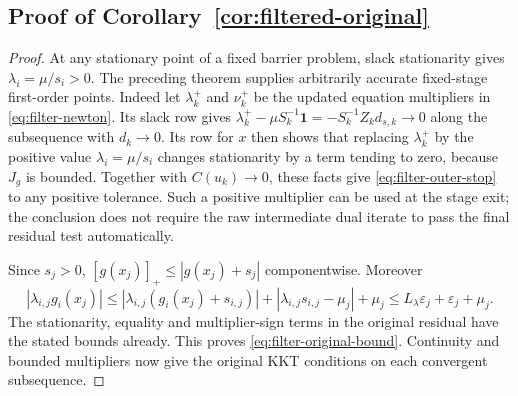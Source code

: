 \documentclass[pdflatex,sn-mathphys-num]{sn-jnl}
\theoremstyle{thmstyleone}
\theoremstyle{thmstylethree}
\begin{document}
\subsection{Proof of Corollary~\ref{cor:filtered-original}}
\begin{proof}
At any stationary point of a fixed barrier problem, slack
stationarity gives $\lambda_i=\mu/s_i>0$.
The preceding theorem supplies arbitrarily accurate fixed-stage
first-order points. Indeed let $\lambda_k^+$ and $\nu_k^+$ be the
updated equation multipliers in \eqref{eq:filter-newton}.
Its slack row gives
$\lambda_k^+-\mu S_k^{-1}\mathbf1
 =-S_k^{-1}Z_kd_{s,k}\to0$
along the subsequence with $d_k\to0$.
Its row for $x$ then shows that replacing $\lambda_k^+$ by the
positive value $\lambda_i=\mu/s_i$ changes stationarity
by a term tending to zero, because $J_g$ is bounded.
Together with $C(u_k)\to0$, these facts give
\eqref{eq:filter-outer-stop} to any positive tolerance.
Such a positive multiplier can be used at the stage exit;
the conclusion does not require the raw intermediate dual iterate
to pass the final residual test automatically.

Since $s_j>0$,
$[g(x_j)]_+\leq|g(x_j)+s_j|$ componentwise.
Moreover
\[
 |\lambda_{i,j}g_i(x_j)|
 \leq|\lambda_{i,j}(g_i(x_j)+s_{i,j})|
       +|\lambda_{i,j}s_{i,j}-\mu_j|+\mu_j
 \leq L_\lambda\varepsilon_j+\varepsilon_j+\mu_j .
\]
The stationarity, equality and multiplier-sign terms in the
original residual have the stated bounds already.
This proves \eqref{eq:filter-original-bound}.
Continuity and bounded multipliers now give the original KKT
conditions on each convergent subsequence.
\end{proof}


\end{document}
